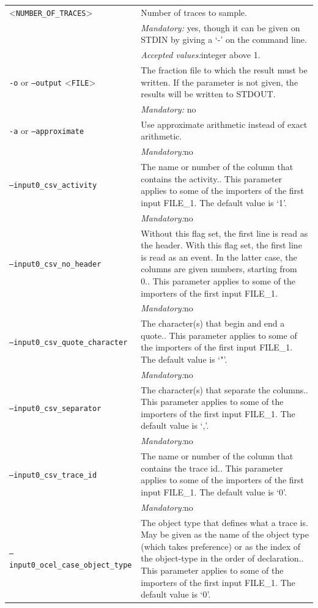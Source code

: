 {\begin{tabularx}{\linewidth}{lX}
<\texttt{NUMBER\_OF\_TRACES}>&Number of traces to sample.\\
&\textit{Mandatory:} \quad yes, though it can be given on STDIN by giving a `-' on the command line.\\
&\textit{Accepted values:}\quad integer above 1.\\
\texttt{-o} or \texttt{--output} <\texttt{FILE}> &
The fraction file to which the result must be written. If the parameter is not given, the results will be written to STDOUT.\\
&\textit{Mandatory:} \quad no\\
\texttt{-a} or \texttt{--approximate} & Use approximate arithmetic instead of exact arithmetic.\\
&\textit{Mandatory:}\quad no\\
\texttt{--input0\_csv\_activity} & The name or number of the column that contains the activity.. This parameter applies to some of the importers of the first input FILE\_1. The default value is `1'.\\
&\textit{Mandatory:}\quad no\\
\texttt{--input0\_csv\_no\_header} & Without this flag set, the first line is read as the header. 
    With this flag set, the first line is read as an event. In the latter case, the columns are given numbers, starting from 0.. This parameter applies to some of the importers of the first input FILE\_1. \\
&\textit{Mandatory:}\quad no\\
\texttt{--input0\_csv\_quote\_character} & The character(s) that begin and end a quote.. This parameter applies to some of the importers of the first input FILE\_1. The default value is `"'.\\
&\textit{Mandatory:}\quad no\\
\texttt{--input0\_csv\_separator} & The character(s) that separate the columns.. This parameter applies to some of the importers of the first input FILE\_1. The default value is `,'.\\
&\textit{Mandatory:}\quad no\\
\texttt{--input0\_csv\_trace\_id} & The name or number of the column that contains the trace id.. This parameter applies to some of the importers of the first input FILE\_1. The default value is `0'.\\
&\textit{Mandatory:}\quad no\\
\texttt{--input0\_ocel\_case\_object\_type} & The object type that defines what a trace is. May be given as the name of the object type (which takes preference) or as the index of the object-type in the order of declaration.. This parameter applies to some of the importers of the first input FILE\_1. The default value is `0'.\\

\end{tabularx}}
